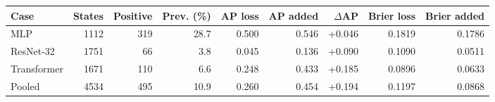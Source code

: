 \begin{tabular}{lrrrrrrrr}
\hline
Case & States & Positive & Prev. (\%) & AP loss & AP added & $\Delta$AP & Brier loss & Brier added \\
\hline
MLP & 1112 & 319 & 28.7 & 0.500 & 0.546 & +0.046 & 0.1819 & 0.1786 \\
ResNet-32 & 1751 & 66 & 3.8 & 0.045 & 0.136 & +0.090 & 0.1090 & 0.0511 \\
Transformer & 1671 & 110 & 6.6 & 0.248 & 0.433 & +0.185 & 0.0896 & 0.0633 \\
Pooled & 4534 & 495 & 10.9 & 0.260 & 0.454 & +0.194 & 0.1197 & 0.0868 \\
\hline
\end{tabular}
